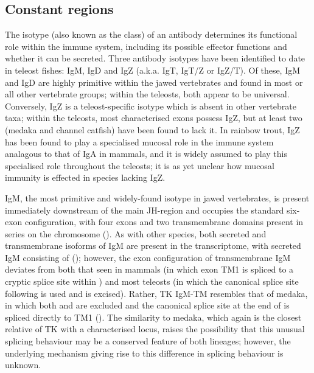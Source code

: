 	\subsection{Constant regions}
	\label{sec:nfu-locus-constant}
	
	The isotype (also known as the class) of an antibody determines its functional role within the immune system, including its possible effector functions and whether it can be secreted. Three antibody isotypes have been identified to date in teleost fishes: IgM, IgD and IgZ (a.k.a. IgT, IgT/Z or IgZ/T). Of these, IgM and IgD are highly primitive within the jawed vertebrates and found in most or all other vertebrate groups; within the teleosts, both appear to be universal. Conversely, IgZ is a teleost-specific isotype which is absent in other vertebrate taxa; within the teleosts, most characterised exons possess IgZ, but at least two (medaka and channel catfish) have been found to lack it. In rainbow trout, IgZ has been found to play a specialised mucosal role in the immune system analagous to that of IgA in mammals, and it is widely assumed to play this specialised role throughout the teleosts; it is as yet unclear how mucosal immunity is effected in species lacking IgZ.
	
	IgM, the most primitive and widely-found isotype in jawed vertebrates, is present immediately downstream of the main JH-region and occupies the standard six-exon configuration, with four \cm{} exons and two transmembrane domains present in series on the chromosome (). As with other species, both secreted and transmembrane isoforms of IgM are present in the transcriptome, with secreted IgM consisting of  (); however, the exon configuration of transmembrane IgM deviates from both that seen in mammals (in which exon TM1 is spliced to a cryptic splice site within ) and most teleosts (in which the canonical splice site following  is used and  is excised). Rather, TK IgM-TM resembles that of medaka, in which both  and  are excluded and the canonical splice site at the end of  is spliced directly to TM1 (). The similarity to medaka, which again is the closest relative of TK with a characterised locus, raises the possibility that this unusual splicing behaviour may be a conserved feature of both lineages; however, the underlying mechanism giving rise to this difference in splicing behaviour is unknown.
	
